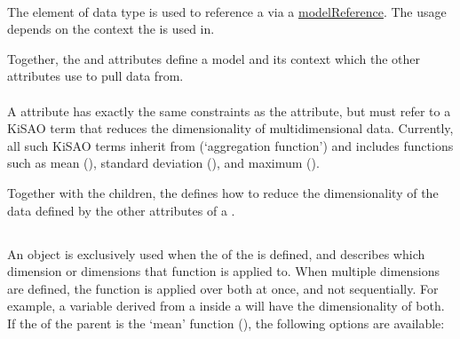 \paragraph*{}
\label{sec:modelReferenceAttribute}
The  element of data type \SIdRef is used to reference a \Model via a \hyperref[sec:modelReference]{modelReference}. The usage depends on the context the \Variable is used in.

Together, the  and  attributes define a model and its context which the other attributes use to pull data from.


\paragraph*{}
\label{sec:dimensionTerm}
A  attribute has exactly the same constraints as the  attribute, but must refer to a KiSAO term that reduces the dimensionality of multidimensional data.  Currently, all such KiSAO terms inherit from  (`aggregation function') and includes functions such as mean (), standard deviation (), and maximum ().

Together with the \AppliedDimension children, the  defines how to reduce the dimensionality of the data defined by the other attributes of a \Variable.



\subsection{}
\label{class:appliedDimension}
\label{class:listOfAppliedDimensions}

An \AppliedDimension object is exclusively used when the  of the \Variable is defined, and describes which dimension or dimensions that function is applied to.  When multiple dimensions are defined, the function is applied over both at once, and not sequentially.  For example, a variable derived from a \Task inside a \RepeatedTask will have the dimensionality of both.  If the  of the parent \Variable is the `mean' function (), the following options are available:

